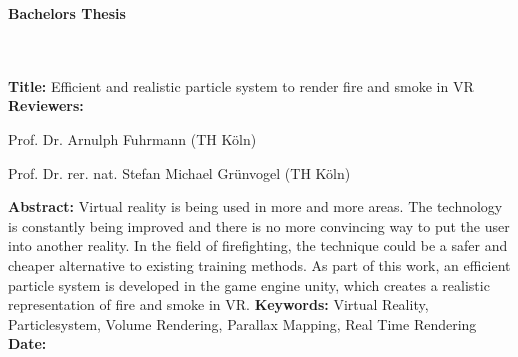 \begin{flushleft}
    \begin{huge}
        \textbf{Bachelors Thesis}
    \end{huge}
    ~\\
    ~\\
    \textbf{Title:} Efficient and realistic particle system to render fire and smoke in VR
    ~\\
    \doublespacing
    \textbf{Reviewers:}
    \begin{description}
        \vspace{-0.2cm}
        \itemsep-8pt
        \item[–]
            Prof. Dr. Arnulph Fuhrmann (TH Köln)
        \item[–]
            Prof. Dr. rer. nat. Stefan Michael Grünvogel (TH Köln)
    \end{description}
    \vspace{-0.5cm}
    \singlespacing
    \textbf{Abstract:}
    Virtual reality is being used in more and more areas.
    The technology is constantly being improved and there is no more convincing way to put the user into another reality.
    In the field of firefighting, the technique could be a safer and cheaper alternative to existing training methods.
    As part of this work, an efficient particle system is developed in the game engine unity, which creates a realistic representation of fire and smoke in VR.
    \singlespacing
    \textbf{Keywords:} Virtual Reality, Particlesystem, Volume Rendering, Parallax Mapping, Real Time Rendering\\
    \doublespacing
    \textbf{Date:}
\end{flushleft}

